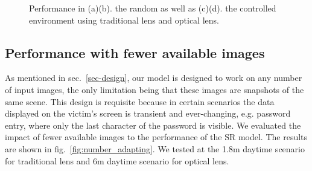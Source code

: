 \begin{figure}[!t]
    \centering
    \hfill
    \caption{Performance in (a)(b). the random as well as (c)(d). the controlled environment using traditional lens and optical lens.}
    \label{fig:control_random}
\end{figure}


\subsection{Performance with fewer available images}
As mentioned in sec.~\ref{sec-design}, our model is designed to work on any number of input images, the only limitation being that these images are snapshots of the same scene. This design is requisite because in certain scenarios the data displayed on the victim's screen is transient and ever-changing, e.g. password entry, where only the last character of the password is visible. We evaluated the impact of fewer available images to the performance of the SR model. The results are shown in fig.~\ref{fig:number_adapting}. We tested at the 1.8m daytime scenario for traditional lens and 6m daytime scenario for optical lens.

